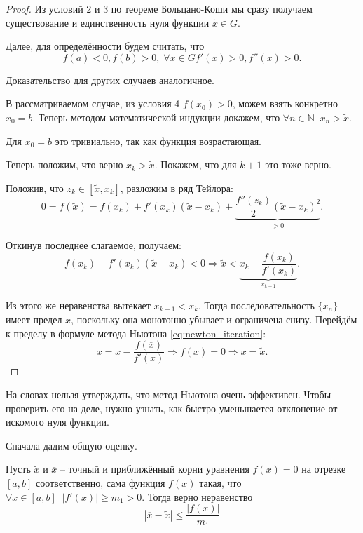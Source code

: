 \documentclass[../main.tex]{subfile}
\begin{document}
\begin{proof}
	Из условий 2 и 3 по теореме Больцано-Коши мы сразу получаем существование
	и единственность нуля функции $\widetilde{x}\in G$.

	Далее, для определённости будем считать, что
	\[f(a)<0, f(b)>0,\;\forall x\in G f'(x)>0, f''(x)>0.\]

	Доказательство для других случаев аналогичное.

	В рассматриваемом случае, из условия 4 $f(x_0)>0$, можем взять конкретно
	$x_0=b$. Теперь методом математической индукции докажем, что
	$\forall n\in \mathbb N\;\;x_n>\widetilde{x}$.

	Для $x_0=b$ это тривиально, так как функция возрастающая.

	Теперь положим, что верно $x_k>\widetilde{x}$. Покажем, что для $k+1$
	это тоже верно.

	Положив, что $z_k\in[\widetilde{x},x_k]$, разложим в ряд Тейлора:
	\[0=f(\widetilde{x})=f(x_k)+f'(x_k)(\widetilde{x}-x_k)+
		\underset{>0}{\underbrace{\frac{f''(z_k)}
		{2}(\widetilde{x}-x_k)^2}}.\]

	Откинув последнее слагаемое, получаем:
	\[f(x_k)+f'(x_k)(\widetilde{x}-x_k)<0\Rightarrow
		\widetilde{x}<\underset{x_{k+1}}{
			\underbrace{x_k-\frac{f(x_k)}{f'(x_k)}}}.\]

	Из этого же неравенства вытекает $x_{k+1}<x_k$. Тогда последовательность
	$\{x_n\}$ имеет предел $\overline{x}$, поскольку она монотонно убывает и
	ограничена снизу. Перейдём к пределу в формуле метода Ньютона
	\eqref{eq:newton_iteration}:
	\[\overline{x}=\overline{x}-\frac{f(\overline{x})}{f'(\overline{x})}
		\Rightarrow f(\overline{x})=0\Rightarrow \overline{x}=
		\widetilde{x}.\]
\end{proof}

На словах нельзя утверждать, что метод Ньютона очень эффективен. Чтобы проверить
его на деле, нужно узнать, как быстро уменьшается отклонение от искомого нуля
функции.

Сначала дадим общую оценку.

\begin{lemma}\label{eq:general_error}
	Пусть $\widetilde{x}$ и $\overline{x}$ -- точный и приближённый корни
	уравнения $f(x)=0$ на отрезке $[a,b]$ соответственно, сама функция
	$f(x)$ такая, что \\ $\forall x\in[a,b]\;\;|f'(x)|\ge m_1>0$. Тогда
	верно неравенство
	\[\boxed{|\overline{x}-\widetilde{x}|\le\frac{|f(\overline{x})|}
	{m_1}}\]
\end{lemma}
\end{document}
